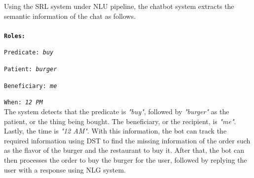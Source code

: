Using the SRL system under NLU pipeline, the chatbot system extracts the semantic information of the chat as follows.
\\
\\
\texttt{\textbf{Roles:}}

\texttt{Predicate: \textit{buy}}

\texttt{Patient: \textit{burger}}

\texttt{Beneficiary: \textit{me}}

\texttt{When: \textit{12 PM}}
\\

The system detects that the predicate is \textit{"buy"}, followed by \textit{"burger"} as the patient, or the thing being bought. The beneficiary, or the recipient, is \textit{"me"}. Lastly, the time is \textit{"12 AM"}. With this information, the bot can track the required information using DST to find the missing information of the order such as the flavor of the burger and the restaurant to buy it. After that, the bot can then processes the order to buy the burger for the user, followed by replying the user with a response using NLG system.

%
%
%
%
%
%

